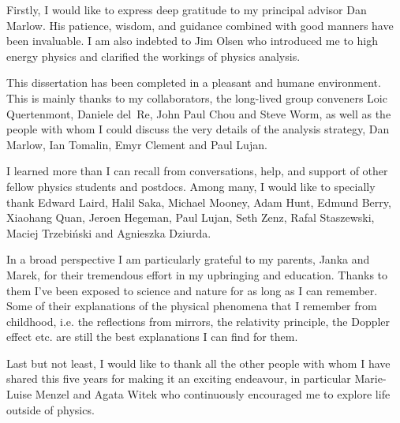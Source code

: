 
Firstly, I would like to express deep gratitude to my principal advisor Dan Marlow. His patience,
wisdom, and guidance combined with good manners have been invaluable. 
I am also indebted to Jim Olsen who introduced me to high energy physics and clarified the workings
of physics analysis.


This dissertation has been completed in a pleasant and humane environment. This is mainly
thanks to my collaborators, the
long-lived group conveners Loic Quertenmont, Daniele del~Re, John Paul Chou and Steve Worm,
as well as the people with whom I could discuss the very details of the analysis strategy,
Dan Marlow, Ian Tomalin, Emyr Clement and Paul Lujan.

I learned more than I can recall from conversations, help, and support of other fellow
physics students and postdocs. Among many, I would like to specially thank Edward Laird, Halil Saka,
Michael Mooney, Adam Hunt, Edmund Berry, Xiaohang Quan, Jeroen Hegeman, Paul Lujan, Seth Zenz,
Rafal Staszewski, Maciej Trzebi\'nski and Agnieszka Dziurda. 

In a broad perspective I am particularly grateful to my parents, Janka and Marek, for their tremendous effort in my upbringing and education.
 Thanks to them I've been exposed to science and nature for as long as I can remember. Some of their explanations of the physical phenomena that I remember from childhood,
i.e. the reflections from mirrors, the relativity principle, the Doppler effect etc.
are still the best explanations I can find for them.

Last but not least, I would like to thank all the other people with whom I have shared 
this five years for making it an exciting endeavour, in particular Marie-Luise Menzel and Agata
Witek who continuously encouraged me to explore
life outside of physics.
